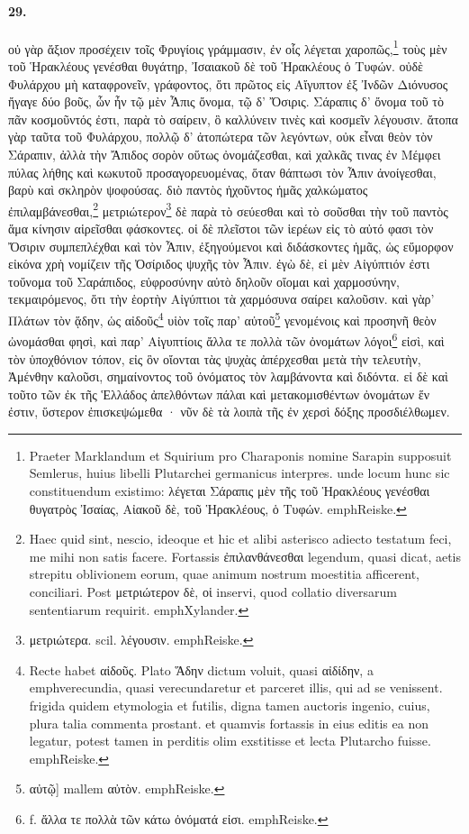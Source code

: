 \documentclass[a4paper, 11pt, oneside, polutonikogreek, german]{article}
\begin{document}
\paragraph{29.}
οὐ γὰρ ἄξιον προσέχειν τοῖς Φρυγίοις γράμμασιν, ἐν οἷς λέγεται χαροπῶς,\footnote{Praeter Marklandum et Squirium pro Charaponis nomine Sarapin supposuit Semlerus, huius libelli Plutarchei germanicus interpres. unde locum hunc sic constituendum existimo: λέγεται Σάραπις μὲν τῆς τοῦ Ἡρακλέους γενέσθαι θυγατρὸς Ἰσαίας, Αἰακοῦ δὲ, τοῦ Ἡρακλέους, ὁ Τυφών. emph{Reiske.}} τοὺς μὲν τοῦ Ἡρακλέους γενέσθαι θυγάτηρ, Ἰσαιακοῦ δὲ τοῦ Ἡρακλέους ὁ Τυφών. οὐδὲ Φυλάρχου μὴ καταφρονεῖν, γράφοντος, ὅτι πρῶτος εἰς Αἴγυπτον ἐξ Ἰνδῶν Διόνυσος ἤγαγε δύο βοῦς, ὧν ἦν τῷ μὲν Ἆπις ὄνομα, τῷ δ' Ὄσιρις. Σάραπις δ' ὄνομα τοῦ τὸ πᾶν κοσμοῦντός ἐστι, παρὰ τὸ σαίρειν, ὃ καλλύνειν τινὲς καὶ κοσμεῖν λέγουσιν. ἄτοπα γὰρ ταῦτα τοῦ Φυλάρχου, πολλῷ δ' ἀτοπώτερα τῶν λεγόντων, οὐκ εἶναι θεὸν τὸν Σάραπιν, ἀλλὰ τὴν Ἄπιδος σορὸν οὕτως ὀνομάζεσθαι, καὶ χαλκᾶς τινας ἐν Μέμφει πύλας λήθης καὶ κωκυτοῦ προσαγορευομένας, ὅταν θάπτωσι τὸν Ἆπιν ἀνοίγεσθαι, βαρὺ καὶ σκληρὸν ψοφούσας. διὸ παντὸς ἠχοῦντος ἡμᾶς χαλκώματος ἐπιλαμβάνεσθαι,\footnote{Haec quid sint, nescio, ideoque et hic et alibi asterisco adiecto testatum feci, me mihi non satis facere. Fortassis ἐπιλανθάνεσθαι legendum, quasi dicat, aetis strepitu oblivionem eorum, quae animum nostrum moestitia afficerent, conciliari. Post μετριώτερον δὲ, οἱ inservi, quod collatio diversarum sententiarum requirit. emph{Xylander.}} μετριώτερον\footnote{μετριώτερα. scil. λέγουσιν. emph{Reiske.}} δὲ παρὰ τὸ σεύεσθαι καὶ τὸ σοῦσθαι τὴν τοῦ παντὸς ἅμα κίνησιν αἱρεῖσθαι φάσκοντες. οἱ δὲ πλεῖστοι τῶν ἱερέων εἰς τὸ αὐτό φασι τὸν Ὄσιριν συμπεπλέχθαι καὶ τὸν Ἆπιν, ἐξηγούμενοι καὶ διδάσκοντες ἡμᾶς, ὡς εὔμορφον εἰκόνα χρὴ νομίζειν τῆς Ὀσίριδος ψυχῆς τὸν Ἆπιν. ἐγὼ δὲ, εἰ μὲν Αἰγύπτιόν ἐστι τοὔνομα τοῦ Σαράπιδος, εὐφροσύνην αὐτὸ δηλοῦν οἴομαι καὶ χαρμοσύνην, τεκμαιρόμενος, ὅτι τὴν ἑορτὴν Αἰγύπτιοι τὰ χαρμόσυνα σαίρει καλοῦσιν. καὶ γὰρ' Πλάτων τὸν ᾅδην, ὡς αἰδοῦς\footnote{Recte habet αἰδοῦς. Plato Ἅδην dictum voluit, quasi αἰδίδην, a emph{verecundia}, quasi verecundaretur et parceret illis, qui ad se venissent. frigida quidem etymologia et futilis, digna tamen auctoris ingenio, cuius, plura talia commenta prostant. et quamvis fortassis in eius editis ea non legatur, potest tamen in perditis olim exstitisse et lecta Plutarcho fuisse. emph{Reiske.}} υἱὸν τοῖς παρ' αὐτοῦ\footnote{αὐτῷ] mallem αὐτὸν. emph{Reiske.}} γενομένοις καὶ προσηνῆ θεὸν ὠνομάσθαι φησὶ, καὶ παρ' Αἰγυπτίοις ἄλλα τε πολλὰ τῶν ὀνομάτων λόγοι\footnote{f. ἄλλα τε πολλὰ τῶν κάτω ὀνόματά εἰσι. emph{Reiske.}} εἰσὶ, καὶ τὸν ὑποχθόνιον τόπον, εἰς ὃν οἴονται τὰς ψυχὰς ἀπέρχεσθαι μετὰ τὴν τελευτὴν, Ἀμένθην καλοῦσι, σημαίνοντος τοῦ ὀνόματος τὸν λαμβάνοντα καὶ διδόντα. εἰ δὲ καὶ τοῦτο τῶν ἐκ τῆς Ἑλλάδος ἀπελθόντων πάλαι καὶ μετακομισθέντων ὀνομάτων ἕν ἐστιν, ὕστερον ἐπισκεψώμεθα · νῦν δὲ τὰ λοιπὰ τῆς ἐν χερσὶ δόξης προσδιέλθωμεν.
\end{document}
